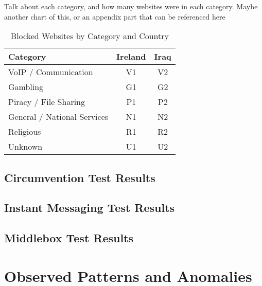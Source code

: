 Talk about each category, and how many websites were in each category. Maybe another chart of this, or an appendix part that can be referenced here

\begin{table}[H]
\centering
\caption{Blocked Websites by Category and Country}
\begin{tabular}{lcc}
\toprule
\textbf{Category} & \textbf{Ireland} & \textbf{Iraq} \\
\midrule
VoIP / Communication        & V1 & V2 \\
Gambling                    & G1 & G2 \\
Piracy / File Sharing       & P1 & P2 \\
General / National Services & N1 & N2 \\
Religious                   & R1 & R2 \\
Unknown                     & U1 & U2 \\
\bottomrule
\end{tabular}
\label{tab:category_block}
\end{table}

\subsection{Circumvention Test Results}



\subsection{Instant Messaging Test Results}



\subsection{Middlebox Test Results}



\section{Observed Patterns and Anomalies}


